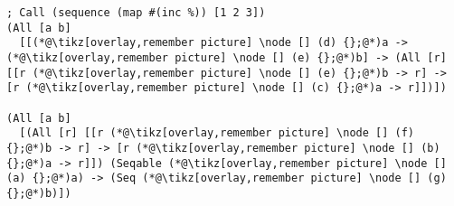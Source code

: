 \documentclass[9pt]{extarticle}
\begin{document}
\begin{lstlisting}
; Call (sequence (map #(inc %)) [1 2 3])
(All [a b]
  [[(*@\tikz[overlay,remember picture] \node [] (d) {};@*)a -> (*@\tikz[overlay,remember picture] \node [] (e) {};@*)b] -> (All [r] [[r (*@\tikz[overlay,remember picture] \node [] (e) {};@*)b -> r] -> [r (*@\tikz[overlay,remember picture] \node [] (c) {};@*)a -> r]])])

(All [a b]
  [(All [r] [[r (*@\tikz[overlay,remember picture] \node [] (f) {};@*)b -> r] -> [r (*@\tikz[overlay,remember picture] \node [] (b) {};@*)a -> r]]) (Seqable (*@\tikz[overlay,remember picture] \node [] (a) {};@*)a) -> (Seq (*@\tikz[overlay,remember picture] \node [] (g) {};@*)b)])
\end{lstlisting}
\end{document}
